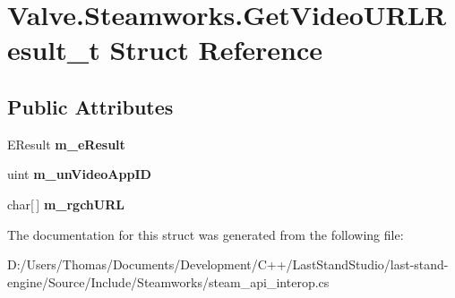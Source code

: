 \hypertarget{structValve_1_1Steamworks_1_1GetVideoURLResult__t}{}\section{Valve.\+Steamworks.\+Get\+Video\+U\+R\+L\+Result\+\_\+t Struct Reference}
\label{structValve_1_1Steamworks_1_1GetVideoURLResult__t}
\subsection*{Public Attributes}
\begin{DoxyCompactItemize}
\item 
\hypertarget{structValve_1_1Steamworks_1_1GetVideoURLResult__t_a0d513c9fb1e8cc8edf04c000afbe7ea7}{}E\+Result {\bfseries m\+\_\+e\+Result}\label{structValve_1_1Steamworks_1_1GetVideoURLResult__t_a0d513c9fb1e8cc8edf04c000afbe7ea7}

\item 
\hypertarget{structValve_1_1Steamworks_1_1GetVideoURLResult__t_a3a5dee4cc310daf30b5d691e4d816b21}{}uint {\bfseries m\+\_\+un\+Video\+App\+I\+D}\label{structValve_1_1Steamworks_1_1GetVideoURLResult__t_a3a5dee4cc310daf30b5d691e4d816b21}

\item 
\hypertarget{structValve_1_1Steamworks_1_1GetVideoURLResult__t_a2a735f24137fbe2e17aaffcf8ad8d339}{}char\mbox{[}$\,$\mbox{]} {\bfseries m\+\_\+rgch\+U\+R\+L}\label{structValve_1_1Steamworks_1_1GetVideoURLResult__t_a2a735f24137fbe2e17aaffcf8ad8d339}

\end{DoxyCompactItemize}


The documentation for this struct was generated from the following file\+:\begin{DoxyCompactItemize}
\item 
D\+:/\+Users/\+Thomas/\+Documents/\+Development/\+C++/\+Last\+Stand\+Studio/last-\/stand-\/engine/\+Source/\+Include/\+Steamworks/steam\+\_\+api\+\_\+interop.\+cs\end{DoxyCompactItemize}
